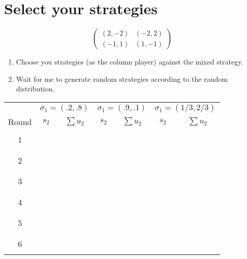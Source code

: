 \documentclass{article}
\begin{document}
\section{Select your strategies}


$$\begin{pmatrix}
(2,-2) & (-2, 2)\\
(-1,1) & (1,-1)
\end{pmatrix}$$

\begin{enumerate}
\item Choose you strategies (as the column player) against the mixed strategy.
\item Wait for me to generate random strategies according to the random distribution.
\end{enumerate}
\vspace{1cm}

\begin{center}
\begin{tabular}{c|c|c|c|c|c|c}
\toprule
& \multicolumn{2}{c|}{$\sigma_1 = (.2,.8)$} & \multicolumn{2}{|c|}{$\sigma_1 = (.9,.1)$} & \multicolumn{2}{|c}{$\sigma_1=(1/3,2/3)$}\\
Round&$s_2$&$\sum u_2$&$s_2$&$\sum u_2$&$s_2$&$\sum u_2$\\
\midrule
&&&&&&\\
1&&&&&&\\
&&&&&&\\
&&&&&&\\
2&&&&&&\\
&&&&&&\\
&&&&&&\\
3&&&&&&\\
&&&&&&\\
&&&&&&\\
4&&&&&&\\
&&&&&&\\
&&&&&&\\
5&&&&&&\\
&&&&&&\\
&&&&&&\\
6&&&&&&\\
&&&&&&\\
\bottomrule
\end{tabular}
\end{center}
\end{document}
